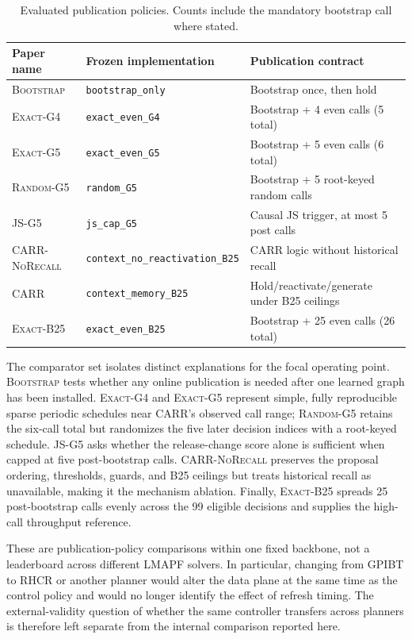 \documentclass[sigconf,review,anonymous]{acmart}
\newcommand{\carr}{\textsc{CARR}\xspace}
\newcommand{\norecall}{\textsc{CARR-NoRecall}\xspace}
\newcommand{\bbootstrap}{\textsc{Bootstrap}\xspace}
\newcommand{\exactfour}{\textsc{Exact-G4}\xspace}
\newcommand{\exactfive}{\textsc{Exact-G5}\xspace}
\newcommand{\randomfive}{\textsc{Random-G5}\xspace}
\newcommand{\jsfive}{\textsc{JS-G5}\xspace}
\newcommand{\exactdense}{\textsc{Exact-B25}\xspace}
\begin{document}
\begin{table}[t]
\caption{Evaluated publication policies. Counts include the mandatory
bootstrap call where stated.}
\label{tab:policies}
\centering
\small
\begin{tabular}{lll}
\toprule
Paper name & Frozen implementation & Publication contract \\
\midrule
\bbootstrap & \texttt{bootstrap\_only} & Bootstrap once, then hold \\
\exactfour & \texttt{exact\_even\_G4} & Bootstrap + 4 even calls (5 total) \\
\exactfive & \texttt{exact\_even\_G5} & Bootstrap + 5 even calls (6 total) \\
\randomfive & \texttt{random\_G5} & Bootstrap + 5 root-keyed random calls \\
\jsfive & \texttt{js\_cap\_G5} & Causal JS trigger, at most 5 post calls \\
\norecall & \texttt{context\_no\_reactivation\_B25} & \carr logic without historical recall \\
\carr & \texttt{context\_memory\_B25} & Hold/reactivate/generate under B25 ceilings \\
\exactdense & \texttt{exact\_even\_B25} & Bootstrap + 25 even calls (26 total) \\
\bottomrule
\end{tabular}
\end{table}

The comparator set isolates distinct explanations for the focal operating
point. \bbootstrap tests whether any online publication is needed after one
learned graph has been installed. \exactfour and \exactfive represent simple,
fully reproducible sparse periodic schedules near \carr's observed call range;
\randomfive retains the six-call total but randomizes the five later decision
indices with a root-keyed schedule. \jsfive asks whether the release-change
score alone is sufficient when capped at five post-bootstrap calls. \norecall
preserves the proposal ordering, thresholds, guards, and B25 ceilings but
treats historical recall as unavailable, making it the mechanism ablation.
Finally, \exactdense spreads 25 post-bootstrap calls evenly across the 99
eligible decisions and supplies the high-call throughput reference.

These are publication-policy comparisons within one fixed backbone, not a
leaderboard across different LMAPF solvers. In particular, changing from GPIBT
to RHCR or another planner would alter the data plane at the same time as the
control policy and would no longer identify the effect of refresh timing. The
external-validity question of whether the same controller transfers across
planners is therefore left separate from the internal comparison reported
here.
\end{document}
